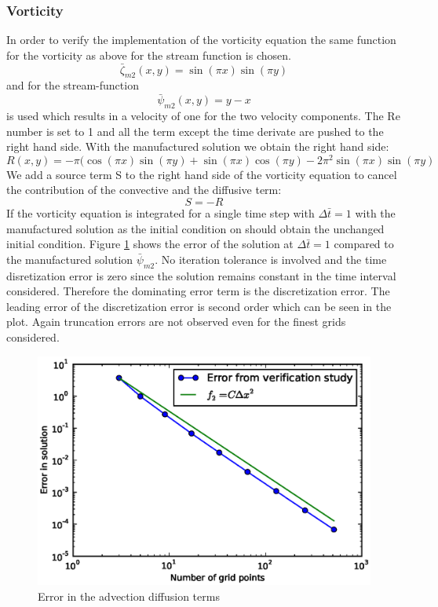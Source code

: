 \subsubsection{Vorticity}
In order to verify the implementation of the vorticity equation the same function for the vorticity as above for the stream function is chosen.
\begin{equation}
\bar{\zeta}_{m2}(x,y) = \sin(\pi x) \sin(\pi y)
\end{equation}
and for the stream-function
\begin{equation}
\bar{\psi}_{m2}(x,y) = y-x
\end{equation}
is used which results in a velocity of one for the two velocity components. The Re number is set to 1 and all the term except the time derivate are pushed to the right hand side. With the manufactured solution we obtain the right hand side:
\begin{equation}
R (x,y) = -\pi (\cos(\pi x) \sin(\pi y) + \sin(\pi x) \cos(\pi y) - 2 \pi ^2 \sin(\pi x) \sin(\pi y) 
\end{equation}
We add a source term S to the right hand side of the vorticity equation to cancel the contribution of the convective and the diffusive term:
\begin{equation}
S = -R
\end{equation}
If the vorticity equation is integrated for a single time step with $\Delta \bar{t}=1$ with the manufactured solution as the initial condition on should obtain the unchanged initial condition. Figure \ref{fig:code_verification_euler} shows the error of the solution at $\Delta \bar{t}=1$ compared to the manufactured solution $\bar{\psi}_{m2}$. No iteration tolerance is involved and the time disretization error is zero since the solution remains constant in the time interval considered. Therefore the dominating error term is the discretization error. The leading error of the discretization error is second order which can be seen in the plot. Again truncation errors are not observed even for the finest grids considered.
%
\begin{figure}[H]
\centering
\includegraphics[scale=0.8]{"figs/code_verification_euler"}
\caption{Error in the advection diffusion terms}
\label{fig:code_verification_euler}
\end{figure}
%
